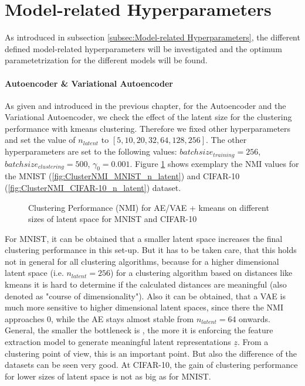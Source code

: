 \documentclass[12pt,DIV14,BCOR12mm,a4paper,footexclude,headinclude,halfparskip-,twoside,openright,openany,cleardoubleempty,idxtotoc,bibtotoc]{scrreprt} %
\numberwithin{equation}{chapter}
\begin{document}
\section{Model-related Hyperparameters}
As introduced in subsection \ref{subsec:Model-related Hyperparameters}, the different defined model-related hyperparameters will be investigated and the optimum parametetrization for the different models will be found. 
\paragraph{Autoencoder \& Variational Autoencoder}
As given and introduced in the previous chapter, for the Autoencoder and the Variational Autoencoder, we check the effect of the latent size for the clustering performance with kmeans clustering. Therefore we fixed other hyperparameters and set the value of $n_{latent}$ to $[5, 10, 20, 32, 64, 128, 256]$. The other hyperparameters are set to the following values: $batchsize_{training} = 256$, $batchsize_{clustering} = 500$, $\gamma_0 = 0.001$. Figure \ref{fig:ClusterPerformance_latentSpace} shows exemplary the NMI values for the MNIST (\ref{fig:ClusterNMI_MNIST_n_latent}) and CIFAR-10 (\ref{fig:ClusterNMI_CIFAR-10_n_latent}) dataset.
	\begin{figure}[htb!]
		\centering
		\qquad
		\caption{Clustering Performance (NMI) for AE/VAE + kmeans on different sizes of latent space for MNIST and CIFAR-10}
		\label{fig:ClusterPerformance_latentSpace}
	\end{figure}
For MNIST, it can be obtained that a smaller latent space increases the final clustering performance in this set-up. But it has to be taken care, that this holds not in general for all clustering algorithms, because for a higher dimensional latent space (i.e. $n_{latent} = 256$) for a clustering algorithm based on distances like kmeans it is hard to determine if the calculated distances are meaningful (also denoted as "course of dimensionality"). Also it can be obtained, that a VAE is much more sensitive to higher dimensional latent spaces, since there the NMI approaches $0$, while the AE stays almost stable from $n_{latent} = 64$ onwards. General, the smaller the bottleneck is , the more it is enforcing the feature extraction model to generate meaningful latent representations $\underline{z}$. From a clustering point of view, this is an important point. But also the difference of the datasets can be seen very good. At CIFAR-10, the gain of clustering performance for lower sizes of latent space is not as big as for MNIST. 
\end{document}
